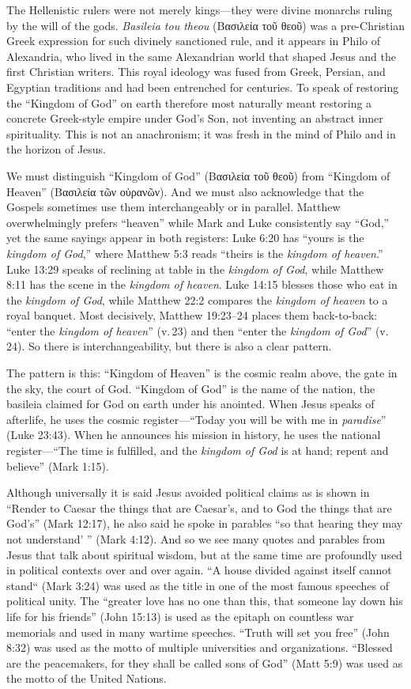 The Hellenistic rulers were not merely kings---they were divine monarchs ruling by the will of the gods.
\emph{Basileia tou theou} (Βασιλεία τοῦ θεοῦ) was a pre-Christian Greek expression for such divinely sanctioned rule, and it appears in Philo of Alexandria, who lived in the same Alexandrian world that shaped Jesus and the first Christian writers.
This royal ideology was fused from Greek, Persian, and Egyptian traditions and had been entrenched for centuries.
To speak of restoring the ``Kingdom of God'' on earth therefore most naturally meant restoring a concrete Greek-style empire under God’s Son, not inventing an abstract inner spirituality.
This is not an anachronism; it was fresh in the mind of Philo and in the horizon of Jesus.

We must distinguish ``Kingdom of God'' (Βασιλεία τοῦ θεοῦ) from ``Kingdom of Heaven'' (Βασιλεία τῶν οὐρανῶν).
And we must also acknowledge that the Gospels sometimes use them interchangeably or in parallel.
Matthew overwhelmingly prefers ``heaven'' while Mark and Luke consistently say ``God,'' yet the same sayings appear in both registers:
Luke 6:20 has ``yours is the \emph{kingdom of God},'' where Matthew 5:3 reads ``theirs is the \emph{kingdom of heaven}.''
Luke 13:29 speaks of reclining at table in the \emph{kingdom of God}, while Matthew 8:11 has the scene in the \emph{kingdom of heaven}.
Luke 14:15 blesses those who eat in the \emph{kingdom of God}, while Matthew 22:2 compares the \emph{kingdom of heaven} to a royal banquet.
Most decisively, Matthew 19:23--24 places them back-to-back: ``enter the \emph{kingdom of heaven}'' (v.\,23) and then ``enter the \emph{kingdom of God}'' (v.\,24).
So there is interchangeability, but there is also a clear pattern.

The pattern is this: ``Kingdom of Heaven'' is the cosmic realm above, the gate in the sky, the court of God.
``Kingdom of God'' is the name of the nation, the basileia claimed for God on earth under his anointed.
When Jesus speaks of afterlife, he uses the cosmic register---``Today you will be with me in \emph{paradise}'' (Luke 23:43).
When he announces his mission in history, he uses the national register---``The time is fulfilled, and the \emph{kingdom of God} is at hand; repent and believe'' (Mark 1:15).

Although universally it is said Jesus avoided political claims as is shown in ``Render to Caesar the things that are Caesar's, and to God the things that are God's'' (Mark 12:17), he also said he spoke in parables ``so that hearing they may not understand' '' (Mark 4:12).
And so we see many quotes and parables from Jesus that talk about spiritual wisdom, but at the same time are profoundly used in political contexts over and over again.
``A house divided against itself cannot stand`` (Mark 3:24) was used as the title in one of the most famous speeches of political unity.
The ``greater love has no one than this, that someone lay down his life for his friends'' (John 15:13) is used as the epitaph on countless war memorials and used in many wartime speeches.
``Truth will set you free'' (John 8:32) was used as the motto of multiple universities and organizations.
``Blessed are the peacemakers, for they shall be called sons of God'' (Matt 5:9) was used as the motto of the United Nations.


